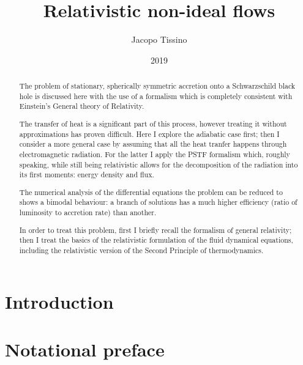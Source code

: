 \documentclass[a4paper, 11pt]{article}
\title{Relativistic non-ideal flows}
\author{Jacopo Tissino}
\date{2019}
\begin{document}



\begin{abstract}
The problem of stationary, spherically symmetric accretion onto a Schwarzschild black hole is discussed here with the use of a formalism which is completely consistent with Einstein's General theory of Relativity.

The transfer of heat is a significant part of this process, however treating it without approximations has proven difficult.
Here I explore the adiabatic case first; then I consider a more general case by assuming that all the heat tranfer happens through electromagnetic radiation.
For the latter I apply the PSTF formalism which, roughly speaking, while still being relativistic allows for the decomposition of the radiation into its first moments: energy density and flux.

The numerical analysis of the differential equations the problem can be reduced to shows a bimodal behaviour: a branch of solutions has a much higher efficiency (ratio of luminosity to accretion rate) than another.

In order to treat this problem, first I briefly recall the formalism of general relativity; then I treat the basics of the relativistic formulation of the fluid dynamical equations, including the relativistic version of the Second Principle of thermodynamics.
\end{abstract}

\setcounter{tocdepth}{2}
\tableofcontents

\section{Introduction} \label{sec:introduction}


\section{Notational preface} \label{sec:notational-preface}

\end{document}
